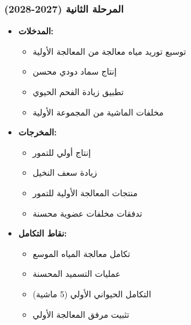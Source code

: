\subsubsection{المرحلة الثانية (2027-2028)}
\begin{itemize}
    \item \textbf{المدخلات:}
    \begin{itemize}
        \item توسيع توريد مياه معالجة من المعالجة الأولية
        \item إنتاج سماد دودي محسن
        \item تطبيق زيادة الفحم الحيوي
        \item مخلفات الماشية من المجموعة الأولية
    \end{itemize}
    \item \textbf{المخرجات:}
    \begin{itemize}
        \item إنتاج أولي للتمور
        \item زيادة سعف النخيل
        \item منتجات المعالجة الأولية للتمور
        \item تدفقات مخلفات عضوية محسنة
    \end{itemize}
    \item \textbf{نقاط التكامل:}
    \begin{itemize}
        \item تكامل معالجة المياه الموسع
        \item عمليات التسميد المحسنة
        \item التكامل الحيواني الأولي (5 ماشية)
        \item تثبيت مرفق المعالجة الأولي
    \end{itemize}
\end{itemize}

